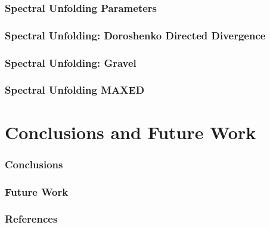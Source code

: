 \documentclass[fleqn]{beamer}
\begin{document}
\begin{frame}
\frametitle{Spectral Unfolding Parameters}

\end{frame}

\begin{frame}
\frametitle{Spectral Unfolding: Doroshenko Directed Divergence}

\end{frame}

\begin{frame}
\frametitle{Spectral Unfolding: Gravel}

\end{frame}

\begin{frame}
\frametitle{Spectral Unfolding MAXED}

\end{frame}

\section{Conclusions and Future Work}
\begin{frame}
\frametitle{Conclusions}

\end{frame}

\begin{frame}
\frametitle{Future Work}

\end{frame}

\begin{frame}
\frametitle{References}

\end{frame}
\end{document}
